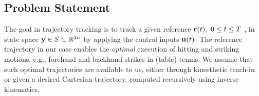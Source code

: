 \subsection{Problem Statement}\label{problemStatement}

The goal in trajectory tracking is to track a given reference $\boldsymbol{\mathrm{r}}(t), \ 0 \leq t \leq T \ $, in state space $\boldsymbol{\mathrm{y}} \in S \subset \mathbb{R}^{2n}$ by applying the control inputs $\boldsymbol{\mathrm{u}}(t)$. The reference trajectory in our case enables the \emph{optimal} execution of hitting and striking motions, e.g., forehand and backhand strikes in (table) tennis. We assume that such optimal trajectories are available to us, either through kinesthetic teach-in or given a desired Cartesian trajectory, computed recursively using inverse kinematics.

